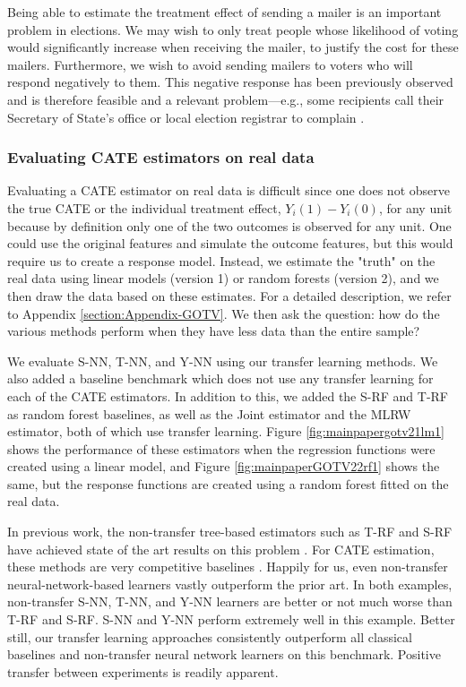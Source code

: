 Being able to estimate the treatment effect of sending a mailer is an important problem in elections. We may wish to only treat people whose likelihood of voting would significantly increase when receiving the mailer, to justify the cost for these mailers. Furthermore, we wish to avoid sending mailers to voters who will respond negatively to them. %
This negative response has been previously observed and is therefore feasible and a relevant problem---e.g., some recipients call their Secretary of State's office or local election registrar to complain \citep{mann2010there,michelson2016risk}.  

\subsubsection*{Evaluating CATE estimators on real data}
Evaluating a CATE estimator on real data is difficult since one does not observe the true CATE or the individual treatment effect, $Y_i(1) - Y_i(0)$, for any unit because by definition only one of the two outcomes is observed for any unit. One could use the original features and simulate the outcome features, but this would require us to create a response model. Instead, we estimate the "truth" on the real data using linear models (version 1) or random forests (version 2), and we then draw the data based on these estimates. For a detailed description, we refer to Appendix \ref{section:Appendix-GOTV}. We then ask the question: how do the various methods perform when they have less data than the entire sample?

We evaluate S-NN, T-NN, and Y-NN using our transfer learning methods. We also added a baseline benchmark which does not use any transfer learning for each of the CATE estimators. 
In addition to this, we added the S-RF and T-RF as random forest baselines, as well as the Joint estimator and the MLRW estimator, both of which use transfer learning.
Figure \ref{fig:mainpapergotv21lm1} shows the performance of these estimators when the regression functions were created using a linear model, and Figure \ref{fig:mainpaperGOTV22rf1} shows the same, but the response functions are created using a random forest fitted on the real data. 

In previous work, the non-transfer tree-based estimators such as T-RF and S-RF have achieved state of the art results on this problem \citep{kunzel2017meta}. For CATE estimation, these methods are very competitive baselines \citep{green2012modeling}. Happily for us, even non-transfer neural-network-based learners vastly outperform the prior art. In both examples, non-transfer S-NN, T-NN, and Y-NN learners are better or not much worse than T-RF and S-RF. S-NN and Y-NN perform extremely well in this example. Better still, our transfer learning approaches consistently outperform all classical baselines and non-transfer neural network learners on this benchmark. Positive transfer between experiments is readily apparent. 

